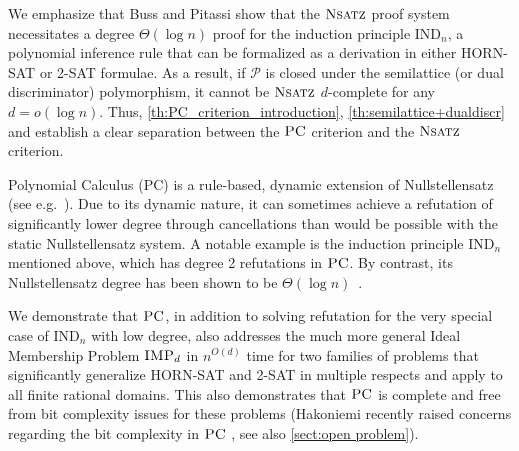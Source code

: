 \documentclass[11pt]{article}
\newcommand{\mon}[1]{\textcolor{magenta}{\textbf{Mon:} #1}}
\newcommand{\IMP}{\textsc{IMP}}
\newcommand{\PC}{\textsc{PC}}
\newcommand{\Nsatz}{\textsc{Nsatz}}
\newcommand{\1}{\textbf{1}}
\begin{document}
We emphasize that Buss and Pitassi \cite{BussP98} 
show that the \(\Nsatz\) proof system necessitates a degree \(\Theta(\log n)\) proof for the induction principle \(\text{IND}_n\), a polynomial inference rule that can be formalized as a derivation in either \textsc{HORN-SAT} or \textsc{2-SAT} formulae. As a result, if \(\mathcal{P}\) is closed under the semilattice (or dual discriminator) polymorphism, it cannot be \(\Nsatz\) \(d\)-complete for any \(d = o(\log n)\).
%
Thus, \cref{th:PC_criterion_introduction}, \cref{th:semilattice+dualdiscr} and \cite{BussP98} establish a clear separation between the $\PC$ criterion and the \(\Nsatz\) criterion. %

    Polynomial Calculus (\PC) is a rule-based, dynamic extension of Nullstellensatz (see e.g.~\cite{FlemingKothariPitassi19}). Due to its dynamic nature, it can sometimes achieve a refutation of significantly lower degree through cancellations than would be possible with the static Nullstellensatz system. A notable example is the induction principle \(\text{IND}_n\) mentioned above, which has degree 2 refutations in $\PC$. By contrast, its Nullstellensatz degree has been shown to be \(\Theta(\log n)\)~\cite{BussP98}.

    We demonstrate that $\PC$, in addition to solving refutation for the very special case of \(\text{IND}_n\) with low degree, also addresses the much more general Ideal Membership Problem $\IMP_d$ in $n^{O(d)}$ time for two families of problems that significantly generalize \textsc{HORN-SAT} and \textsc{2-SAT} in multiple respects and apply to all finite rational domains. This also demonstrates that \(\PC\) is complete and free from bit complexity issues for these problems (Hakoniemi recently raised concerns regarding the bit complexity in \(\PC\) \cite{Hakoniemi21}, see also \cref{sect:open problem}).  
    
\end{document}
